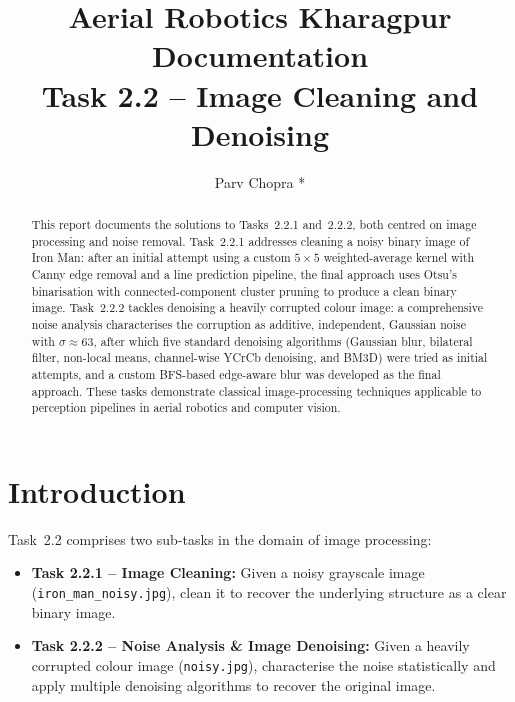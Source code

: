\documentclass[conference, twocolumn]{IEEEtran}
\title{Aerial Robotics Kharagpur Documentation\\Task 2.2 -- Image Cleaning and Denoising}
\author{Parv Chopra *}
\begin{document}
\maketitle

\begin{abstract}
This report documents the solutions to Tasks~2.2.1 and~2.2.2, both centred on image processing and noise removal. Task~2.2.1 addresses cleaning a noisy binary image of Iron Man: after an initial attempt using a custom $5\times5$ weighted-average kernel with Canny edge removal and a line prediction pipeline, the final approach uses Otsu's binarisation with connected-component cluster pruning to produce a clean binary image. Task~2.2.2 tackles denoising a heavily corrupted colour image: a comprehensive noise analysis characterises the corruption as additive, independent, Gaussian noise with $\sigma\approx63$, after which five standard denoising algorithms (Gaussian blur, bilateral filter, non-local means, channel-wise YCrCb denoising, and BM3D) were tried as initial attempts, and a custom BFS-based edge-aware blur was developed as the final approach. These tasks demonstrate classical image-processing techniques applicable to perception pipelines in aerial robotics and computer vision.
\end{abstract}

\section{Introduction}

Task~2.2 comprises two sub-tasks in the domain of image processing:

\begin{itemize}
    \item \textbf{Task 2.2.1 -- Image Cleaning:} Given a noisy grayscale image (\texttt{iron\_man\_noisy.jpg}), clean it to recover the underlying structure as a clear binary image.
    \item \textbf{Task 2.2.2 -- Noise Analysis \& Image Denoising:} Given a heavily corrupted colour image (\texttt{noisy.jpg}), characterise the noise statistically and apply multiple denoising algorithms to recover the original image.
\end{itemize}
\end{document}
